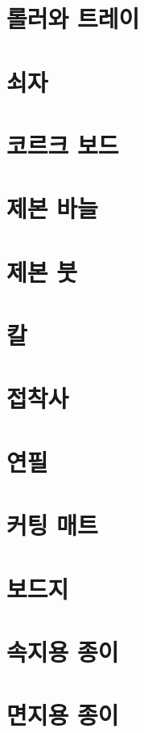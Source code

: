 \documentclass[12pt, a4paper, oneside]{book}
\begin{document}
	\section{롤러와 트레이}

	\section{쇠자}

	\section{코르크 보드}

	\section{제본 바늘}

	\section{제본 붓}

	\section{칼}

	\section{접착사}

	\section{연필}

	\section{커팅 매트}


	\section{보드지}

	\section{속지용 종이}

	\section{면지용 종이}
\end{document}
